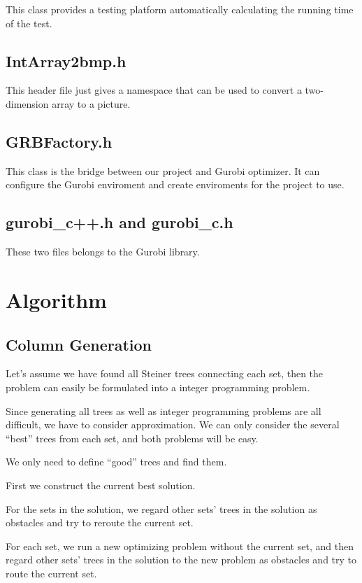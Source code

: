 \documentclass[12pt, a4paper]{article}
\begin{document}
			This class provides a testing platform automatically calculating the running time of the test.

		\subsection{IntArray2bmp.h}

			This header file just gives a namespace that can be used to convert a two-dimension array to a picture.
		
		\subsection{GRBFactory.h}
		
			This class is the bridge between our project and Gurobi optimizer. It can configure the Gurobi enviroment and create enviroments for the project to use.
		
		\subsection{gurobi\_c++.h and gurobi\_c.h}
		
			These two files belongs to the Gurobi library.

	\section{Algorithm}
	
	\subsection{Column Generation}
	
	Let's assume we have found all Steiner trees connecting each set, then the problem can easily be formulated into a integer programming problem.
	
	Since generating all trees as well as integer programming problems are all difficult, we have to consider approximation. We can only consider the several ``best'' trees from each set, and both problems will be easy.
	
	We only need to define ``good'' trees and find them.
	
	First we construct the current best solution.
	
	For the sets in the solution, we regard other sets' trees in the solution as obstacles and try to reroute the current set.
	
	For each set, we run a new optimizing problem without the current set, and then regard other sets' trees in the solution to the new problem as obstacles and try to route the current set.
	
\end{document}
